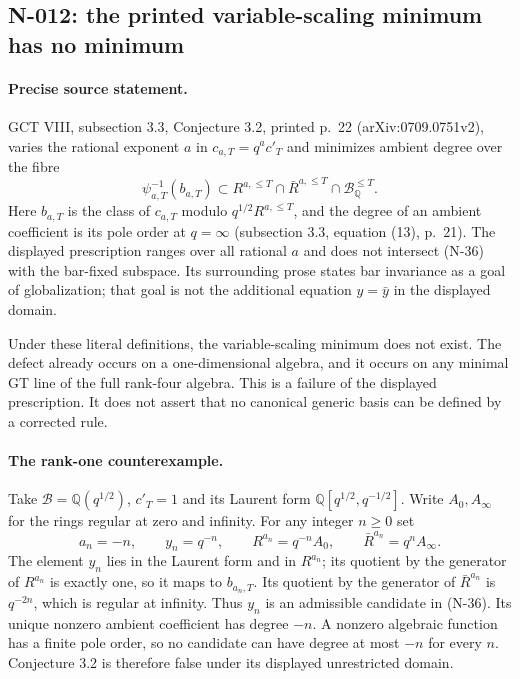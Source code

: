 \subsection{N-012: the printed variable-scaling minimum has no minimum}
\label{sec:nonstandard-viii-scaling}

\paragraph{Precise source statement.}
GCT VIII, subsection 3.3, Conjecture 3.2, printed p.~22
(arXiv:0709.0751v2), varies the rational exponent $a$ in
$c_{a,T}=q^a c'_T$ and minimizes ambient degree over the fibre
\[
 \psi_{a,T}^{-1}(b_{a,T})\subset
 R^{a,\le T}\cap\bar R^{a,\le T}\cap\mathcal B^{\le T}_{\mathbb Q}.
 \tag{N-36}
\]
Here $b_{a,T}$ is the class of $c_{a,T}$ modulo
$q^{1/2}R^{a,\le T}$, and the degree of an ambient coefficient is
its pole order at $q=\infty$ (subsection 3.3, equation (13), p.~21).
The displayed prescription ranges over all rational $a$ and does
not intersect (N-36) with the bar-fixed subspace.  Its surrounding
prose states bar invariance as a goal of globalization; that goal is
not the additional equation $y=\bar y$ in the displayed domain.

Under these literal definitions, the variable-scaling minimum does
not exist.  The defect already occurs on a one-dimensional algebra,
and it occurs on any minimal GT line of the full rank-four algebra.
This is a failure of the displayed prescription.  It does not assert
that no canonical generic basis can be defined by a corrected rule.

\paragraph{The rank-one counterexample.}
Take $\mathcal B=\mathbb Q(q^{1/2})$, $c'_T=1$ and its Laurent
form $\mathbb Q[q^{1/2},q^{-1/2}]$.  Write $A_0,A_\infty$ for
the rings regular at zero and infinity.  For any integer $n\ge0$ set
\[
 a_n=-n,\qquad y_n=q^{-n},\qquad
 R^{a_n}=q^{-n}A_0,\qquad\bar R^{a_n}=q^n A_\infty.
 \tag{N-37}
\]
The element $y_n$ lies in the Laurent form and in $R^{a_n}$;
its quotient by the generator of $R^{a_n}$ is exactly one, so
it maps to $b_{a_n,T}$.  Its quotient by the generator of
$\bar R^{a_n}$ is $q^{-2n}$, which is regular at infinity.
Thus $y_n$ is an admissible candidate in (N-36).  Its unique
nonzero ambient coefficient has degree $-n$.  A nonzero algebraic
function has a finite pole order, so no candidate can have degree
at most $-n$ for every $n$.  Conjecture 3.2 is therefore false
under its displayed unrestricted domain.


